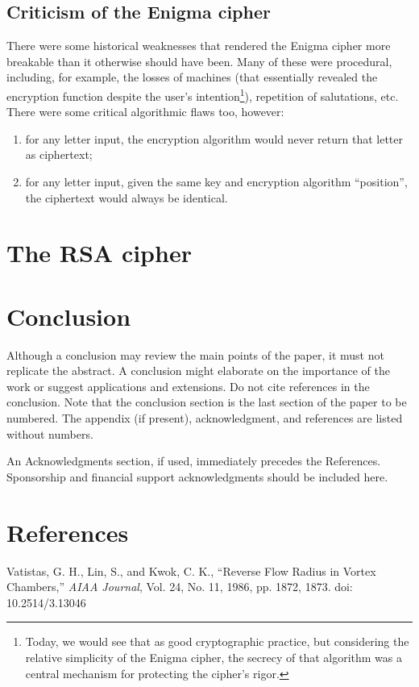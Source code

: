 \documentclass{AIAA}
\begin{document}
\subsection{Criticism of the Enigma cipher}

There were some historical weaknesses that rendered the Enigma cipher more breakable than it otherwise should have been. Many of these were procedural, including, for example, the losses of machines (that essentially revealed the encryption function despite the user's intention\footnote{Today, we would see that as good cryptographic practice, but considering the relative simplicity of the Enigma cipher, the secrecy of that algorithm was a central mechanism for protecting the cipher's rigor.}), repetition of salutations, etc. There were some critical algorithmic flaws too, however:  
\begin{enumerate}
\item for any letter input, the encryption algorithm would never return that letter as ciphertext;
\item for any letter input, given the same key and encryption algorithm ``position'', the ciphertext would always be identical. 
\end{enumerate}


\section{The RSA cipher}

\section{Conclusion}
Although a conclusion may review the main points of the paper, it must not replicate the abstract. A conclusion might elaborate on the importance of the work or suggest applications and extensions. Do not cite references in the conclusion. Note that the conclusion section is the last section of the paper to be numbered. The appendix (if present), acknowledgment, and references are listed without numbers.

An Acknowledgments section, if used, immediately precedes the References. Sponsorship and financial support acknowledgments should be included here.

\section*{References}

\begin{thebibliography}{}
 Vatistas, G. H., Lin, S., and Kwok, C. K., ``Reverse Flow Radius in Vortex Chambers,'' \textit{AIAA Journal}, Vol. 24, No. 11, 1986, pp. 1872, 1873. doi: 10.2514/3.13046

\end{thebibliography}
\end{document}
